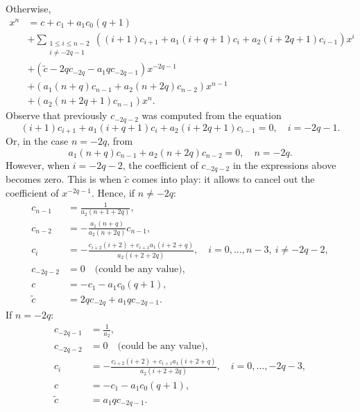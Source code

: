 \documentclass[11pt]{article}
\theoremstyle{definition}
\theoremstyle{plain}
\theoremstyle{remark}
\begin{document}
\begin{enumerate}
\begin{itemize}
Otherwise,
\begin{align*}
x^n &= c + c_1 + a_1c_0(q+1)  \\
&+ \sum\limits_{\substack{1 \leq i \leq n-2 \\ i \neq -2q-1}} ((i+1)c_{i+1} + a_1(i+q+1)c_i + a_2(i+2q+1)c_{i-1})x^i \\
&+ (\tilde{c}-2qc_{-2q} -a_1qc_{-2q-1})x^{-2q-1} \\
&+ (a_1(n+q)c_{n-1}+a_2(n+2q)c_{n-2})x^{n-1} \\
& + (a_2(n+2q+1)c_{n-1})x^n.
\end{align*}
Observe that previously $c_{-2q-2}$ was computed from the equation \[(i+1)c_{i+1} + a_1(i+q+1)c_i + a_2(i+2q+1)c_{i-1}= 0, \quad i = -2q-1.\] 
Or, in the case $n = -2q$, from
\[a_1(n+q)c_{n-1}+a_2(n+2q)c_{n-2}= 0, \quad n = -2q.\]  
However, when $i = -2q-2$, the coefficient of $c_{-2q-2}$ in the expressions above becomes zero. This is when $\tilde{c}$ comes into play: it allows to cancel out the coefficient of $x^{-2q-1}$. Hence, if $n \neq -2q$:
\begin{align*}
c_{n-1} &= \frac{1}{a_2(n+1+2q)}, \\
c_{n-2} &= -\frac{a_1(n+q)}{a_2(n+2q)}c_{n-1}, \\
c_{i} &= -\frac{c_{i+2}(i+2) + c_{i+1}a_1\left(i + 2 + q\right)}{a_2(i + 2 + 2q)}, \quad i=0,\ldots,n-3, \ i \neq -2q-2, \\
c_{-2q-2} &=  0 \quad \text{(could be any value)},\\
c &= -c_1 - a_1c_0(q+1), \\
\tilde{c} &=  2qc_{-2q} + a_1qc_{-2q-1}.
\end{align*}
If $n = -2q$:
\begin{align*}
c_{-2q-1} &= \frac{1}{a_2}, \\ 
c_{-2q-2} &=  0 \quad \text{(could be any value)},\\
c_{i} &= -\frac{c_{i+2}(i+2) + c_{i+1}a_1\left(i + 2 + q\right)}{a_2(i + 2 + 2q)}, \quad i=0,\ldots,-2q-3, \\
c &= -c_1 - a_1c_0(q+1), \\
\tilde{c} &=  a_1qc_{-2q-1}.
\end{align*}
\end{itemize}


\end{enumerate}
\end{document}
